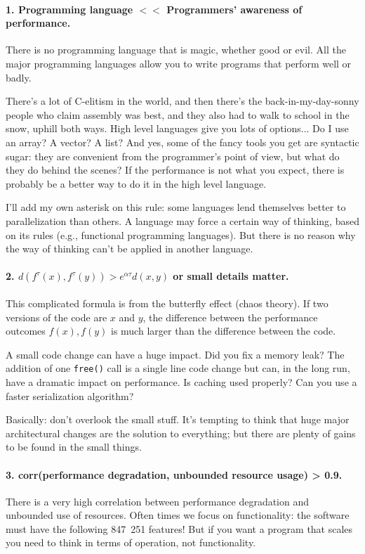 \documentclass[a4paper]{report}
\begin{document}
\paragraph{1. Programming language $<<$ Programmers' awareness of performance.}
There is no programming language that is magic, whether good or evil. All the major programming languages allow you to write programs that perform well or badly. 

There's a lot of C-elitism in the world, and then there's the back-in-my-day-sonny people who claim assembly was best, and they also had to walk to school in the snow, uphill both ways.  High level languages give you lots of options... Do I use an array? A vector? A list? And yes, some of the fancy tools you get are syntactic sugar: they are convenient from the programmer's point of view, but what do they do behind the scenes? If the performance is not what you expect, there is probably be a better way to do it in the high level language.

I'll add my own asterisk on this rule: some languages lend themselves better to parallelization than others. A language may force a certain way of thinking, based on its rules (e.g., functional programming languages). But there is no reason why the way of thinking can't be applied in another language.


\paragraph{2. $d(f^{\tau}(x), f^{\tau}(y)) > e^{\alpha\tau} d(x, y)$ or small details matter.} This complicated formula is from the butterfly effect (chaos theory). If two versions of the code are $x$ and $y$, the difference between the performance outcomes $f(x), f(y)$ is much larger than the difference between the code.

A small code change can have a huge impact. Did you fix a memory leak? The addition of one \texttt{free()} call is a single line code change but can, in the long run, have a dramatic impact on performance. Is caching used properly? Can you use a faster serialization algorithm? 

Basically: don't overlook the small stuff. It's tempting to think that huge major architectural changes are the solution to everything; but there are plenty of gains to be found in the small things.

\paragraph{3. corr(performance degradation, unbounded resource usage) > 0.9.}
There is a very high correlation between performance degradation and unbounded use of resources. Often times we focus on functionality: the software must have the following 847~251 features! But if you want a program that scales you need to think in terms of operation, not functionality.
\end{document}
